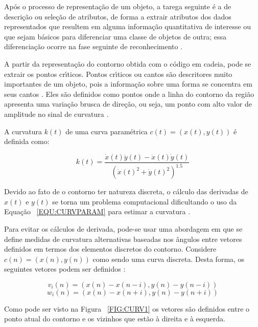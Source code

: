 Ap\'{o}s o processo de representa\c{c}\~{a}o de um objeto, a tarega seguinte \'{e} a de descri\c{c}\~{a}o ou sele\c{c}\~{a}o de atributos, de forma a extrair 
atributos dos dados representados que resultem em alguma informa\c{c}\~{a}o quantitativa de interesse ou que sejam b\'{a}sicos para 
diferenciar uma classe de objetos de outra; essa diferencia\c{c}\~{a}o ocorre na fase seguinte de reconhecimento \cite{HIGASHIMO:2006}.

A partir da representa\c{c}\~{a}o do contorno obtida com o c\'{o}digo em cadeia, pode se extrair os pontos cr\'{\i}ticos. Pontos cr\'{\i}ticos ou cantos 
s\~{a}o descritores muito importantes de um objeto, pois a informa\c{c}\~{a}o sobre uma forma se concentra em seus cantos \cite{MASOOD:2007}. 
Eles s\~{a}o definidos como pontos onde a linha do contorno da regi\~{a}o apresenta uma varia\c{c}\~{a}o brusca de dire\c{c}\~{a}o, ou seja, um ponto com 
alto valor de amplitude no sinal de curvatura \cite{AUZUIR:2005}.

A curvatura $k(t)$ de uma curva param\'{e}trica $c(t) = (x(t), y(t))$ \'{e} definida como:

\begin{equation}
k(t) = \frac{\dot{x}(t)\ddot{y}(t) - \ddot{x}(t)\dot{y}(t)}{(\dot{x}(t)^{2} + \dot{y}(t)^{2})^{1.5}}
\label{EQU:CURVPARAM}
\end{equation}

Devido ao fato de o contorno ter natureza discreta, o c\'{a}lculo das derivadas de $x(t)$ e $y(t)$ se torna um problema computacional 
dificultando o uso da Equa\c{c}\~{a}o ~\ref{EQU:CURVPARAM} para estimar a curvatura \cite{COSTA:2001}.

Para evitar os c\'{a}lculos de derivada, pode-se usar uma abordagem em que se define medidas de curvatura alternativas baseadas nos 
\^{a}ngulos entre vetores definidos em termos dos elementos discretos do contorno. Considere $c(n) = (x(n),y(n))$ como sendo uma curva 
discreta. Desta forma, os seguintes vetores podem ser definidos \cite{COSTA:2001}:

\begin{equation}
v_{i}(n) = (x(n) - x(n-i), y(n) - y(n-i))
\label{EQU:VETCURV1}
\end{equation}
\begin{equation}
w_{i}(n) = (x(n) - x(n+i), y(n) - y(n+i))
\label{EQU:VETCURV2}
\end{equation} 

Como pode ser visto na Figura ~\ref{FIG:CURV1} os vetores s\~{a}o definidos entre o ponto atual do contorno e os vizinhos que est\~{a}o \`{a} 
direita e \`{a} esquerda.

